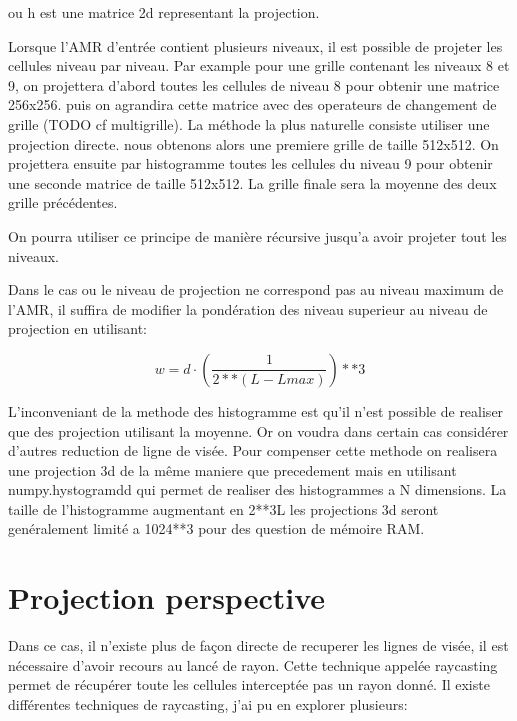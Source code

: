 ou h est une matrice 2d representant la projection.


Lorsque l'AMR d'entrée contient plusieurs niveaux, il est possible de projeter les cellules niveau par niveau.
Par example pour une grille contenant les niveaux 8 et 9, on projettera d'abord toutes les cellules de niveau 8 pour obtenir une matrice 256x256.
puis on agrandira cette matrice avec des operateurs de changement de grille (TODO cf multigrille).
La méthode la plus naturelle consiste utiliser une projection directe.
nous obtenons alors une premiere grille de taille 512x512.
On projettera ensuite par histogramme toutes les cellules du niveau  9 pour obtenir une seconde matrice de taille 512x512.
La grille finale sera la moyenne des deux grille précédentes.

On pourra utiliser ce principe de manière récursive jusqu'a avoir projeter tout les niveaux.

Dans le cas ou le niveau de projection ne correspond pas au niveau maximum de l'AMR, il suffira de modifier la pondération des niveau superieur au niveau de projection en utilisant:

\begin{equation}
w = d \cdot \left( \frac{1}{2**(L-Lmax) }\right) **3
\end{equation}



L'inconveniant de la methode des histogramme est qu'il n'est possible de realiser que des projection utilisant la moyenne.
Or on voudra dans certain cas considérer d'autres reduction de ligne de visée.
Pour compenser cette methode on realisera une projection 3d de la même maniere que precedement mais en utilisant numpy.hystogramdd qui permet de realiser des histogrammes a N dimensions.
La taille de l'histogramme augmentant en 2**3L les projections 3d seront genéralement limité a 1024**3 pour des question de mémoire RAM. 





%








\section{Projection perspective}

Dans ce cas, il n'existe plus de façon directe de recuperer les lignes de visée, il est nécessaire d'avoir recours au lancé de rayon.
Cette technique appelée raycasting permet de récupérer toute les cellules interceptée pas un rayon donné.
Il existe différentes techniques de raycasting, j'ai pu en explorer plusieurs:

